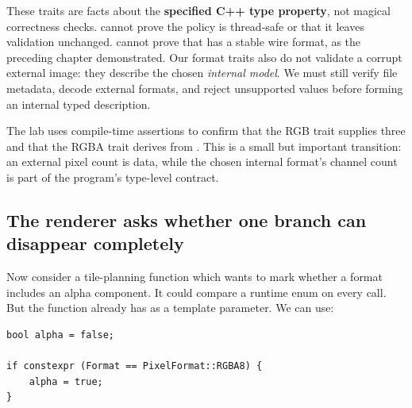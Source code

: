 These traits are facts about the \textbf{specified C++ type property}, not magical correctness checks.  cannot prove the policy is thread-safe or that it leaves validation unchanged.  cannot prove that  has a stable wire format, as the preceding chapter demonstrated. Our format traits also do not validate a corrupt external image: they describe the chosen \emph{internal model}. We must still verify file metadata, decode external formats, and reject unsupported values before forming an internal typed description.

The lab uses compile-time assertions to confirm that the RGB trait supplies three and that the RGBA trait derives from . This is a small but important transition: an external pixel count is data, while the chosen internal format's channel count is part of the program's type-level contract.

\subsection{The renderer asks whether one branch can disappear completely}\label{01-foundations-i-ch005-the-renderer-asks-whether-one-branch-can-disappear-completely}

\hypertarget{01-foundations-i-ch005-the-renderer-asks-whether-one-branch-can-disappear-completely}{}

Now consider a tile-planning function which wants to mark whether a format includes an alpha component. It could compare a runtime enum on every call. But the function already has  as a template parameter. We can use:

\begin{verbatim}
bool alpha = false;

if constexpr (Format == PixelFormat::RGBA8) {
    alpha = true;
}
\end{verbatim}


